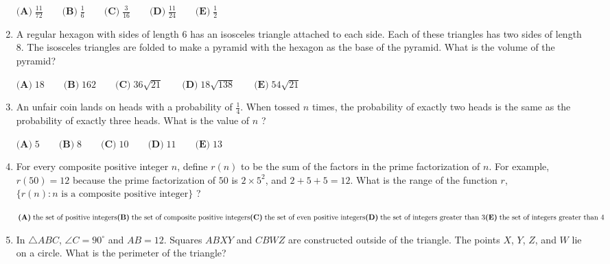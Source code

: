 \documentclass{article}
\begin{document}
\begin{enumerate}[label=\arabic*., itemsep=0.5em]
$\textbf{(A)}\; \frac{11}{72} \qquad\textbf{(B)}\; \frac{1}{6} \qquad\textbf{(C)}\; \frac{3}{16} \qquad\textbf{(D)}\; \frac{11}{24} \qquad\textbf{(E)}\; \frac{1}{2}$\par \vspace{0.5em}\item A regular hexagon with sides of length 6 has an isosceles triangle attached to each side. Each of these triangles has two sides of length 8. The isosceles triangles are folded to make a pyramid with the hexagon as the base of the pyramid. What is the volume of the pyramid?

$\textbf{(A)}\; 18 \qquad\textbf{(B)}\; 162 \qquad\textbf{(C)}\; 36\sqrt{21} \qquad\textbf{(D)}\; 18\sqrt{138} \qquad\textbf{(E)}\; 54\sqrt{21}$\par \vspace{0.5em}\item An unfair coin lands on heads with a probability of $\tfrac{1}{4}$. When tossed $n$ times, the probability of exactly two heads is the same as the probability of exactly three heads. What is the value of $n$ ?

$\textbf{(A)}\; 5 \qquad\textbf{(B)}\; 8 \qquad\textbf{(C)}\; 10 \qquad\textbf{(D)}\; 11 \qquad\textbf{(E)}\; 13$\par \vspace{0.5em}\item For every composite positive integer $n$, define $r(n)$ to be the sum of the factors in the prime factorization of $n$. For example, $r(50) = 12$ because the prime factorization of $50$ is $2 \times 5^{2}$, and $2 + 5 + 5 = 12$. What is the range of the function $r$, $\{r(n): n \text{ is a composite positive integer}\}$ ?

$\textbf{(A)}\; \text{the set of positive integers} \\
\textbf{(B)}\; \text{the set of composite positive integers} \\
\textbf{(C)}\; \text{the set of even positive integers} \\
\textbf{(D)}\; \text{the set of integers greater than 3} \\
\textbf{(E)}\; \text{the set of integers greater than 4}$\par \vspace{0.5em}\item In $\triangle ABC$, $\angle C = 90^\circ$ and $AB = 12$. Squares $ABXY$ and $CBWZ$ are constructed outside of the triangle. The points $X$, $Y$, $Z$, and $W$ lie on a circle. What is the perimeter of the triangle?


\end{enumerate}
\end{document}
